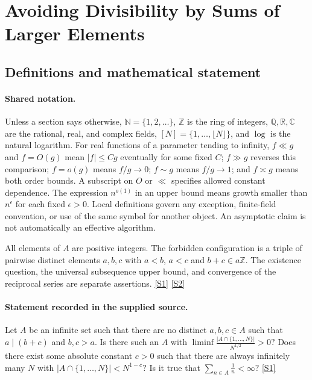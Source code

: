 \documentclass[11pt,a4paper]{article}
\newcommand{\N}{\mathbb{N}}
\newcommand{\Z}{\mathbb{Z}}
\newcommand{\Q}{\mathbb{Q}}
\newcommand{\R}{\mathbb{R}}
\newcommand{\C}{\mathbb{C}}
\newcommand{\sref}[2]{\hyperlink{source:#1:#2}{[S#2]}}
\begin{document}
\section{Avoiding Divisibility by Sums of Larger Elements}\label{statement}


\subsection{Definitions and mathematical statement}

\paragraph{Shared notation.}Unless a section says otherwise, $\N=\{1,2,\ldots\}$,
$\Z$ is the ring of integers, $\Q,\R,\C$ are the rational, real, and complex
fields, $[N]=\{1,\ldots,\lfloor N\rfloor\}$, and $\log$ is the natural
logarithm. For real functions of a parameter tending to infinity,
$f\ll g$ and $f=O(g)$ mean $|f|\leq Cg$ eventually for some fixed $C$;
$f\gg g$ reverses this comparison; $f=o(g)$ means $f/g\to0$;
$f\sim g$ means $f/g\to1$; and $f\asymp g$ means both order bounds.
A subscript on $O$ or $\ll$ specifies allowed constant dependence.
The expression $n^{o(1)}$ in an upper bound means growth smaller than
$n^\epsilon$ for each fixed $\epsilon>0$. Local definitions govern any
exception, finite-field convention, or use of the same symbol for another
object. An asymptotic claim is not automatically an effective algorithm.



All elements of $A$ are positive integers. The forbidden configuration is a triple of pairwise distinct elements $a,b,c$ with $a<b$, $a<c$ and $b+c\in a\Z$. The existence question, the universal subsequence upper bound, and convergence of the reciprocal series are separate assertions. \sref{statement}{1} \sref{statement}{2}

\paragraph{Statement recorded in the supplied source.}
Let $A$ be an infinite set such that there are no distinct $a,b,c\in A$ such that $a\mid (b+c)$ and $b,c>a$. Is there such an $A$ with $ \liminf \frac{\lvert A\cap\{1,\ldots,N\}\rvert}{N^{1/2}}>0? $ Does there exist some absolute constant $c>0$ such that there are always infinitely many $N$ with $ \lvert A\cap\{1,\ldots,N\}\rvert<N^{1-c}? $ Is it true that $ \sum_{n\in A}\frac{1}{n}<\infty? $ \sref{statement}{1}
\end{document}
